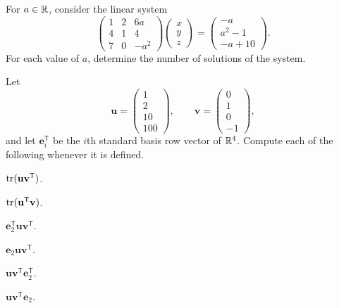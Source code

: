 \documentclass[11pt,oneside]{article}
\begin{document}
\begin{problem}
For $a\in\mathbb{R}$, consider the linear system
\[
\begin{pmatrix}
1&2&6a\\
4&1&4\\
7&0&-a^2
\end{pmatrix}
\begin{pmatrix}x\\y\\z\end{pmatrix}
=
\begin{pmatrix}-a\\a^2-1\\-a+10\end{pmatrix}.
\]
For each value of $a$, determine the number of solutions of the system.
\end{problem}

\begin{problem}
Let
\[
\mathbf u=
\begin{pmatrix}1\\2\\10\\100\end{pmatrix},
\qquad
\mathbf v=
\begin{pmatrix}0\\1\\0\\-1\end{pmatrix},
\]
and let $\mathbf e_i^{\mathsf T}$ be the $i$th standard basis row vector of $\mathbb{R}^4$. Compute each of the following whenever it is defined.
\begin{problemchoices}
\item $\operatorname{tr}(\mathbf u\mathbf v^{\mathsf T})$.
\item $\operatorname{tr}(\mathbf u^{\mathsf T}\mathbf v)$.
\item $\mathbf e_2^{\mathsf T}\mathbf u\mathbf v^{\mathsf T}$.
\item $\mathbf e_2\mathbf u\mathbf v^{\mathsf T}$.
\item $\mathbf u\mathbf v^{\mathsf T}\mathbf e_2^{\mathsf T}$.
\item $\mathbf u\mathbf v^{\mathsf T}\mathbf e_2$.
\end{problemchoices}
\end{problem}
\end{document}
